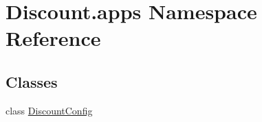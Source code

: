 \hypertarget{namespace_discount_1_1apps}{}\section{Discount.\+apps Namespace Reference}
\label{namespace_discount_1_1apps}
\subsection*{Classes}
\begin{DoxyCompactItemize}
\item 
class \hyperlink{class_discount_1_1apps_1_1_discount_config}{Discount\+Config}
\end{DoxyCompactItemize}
